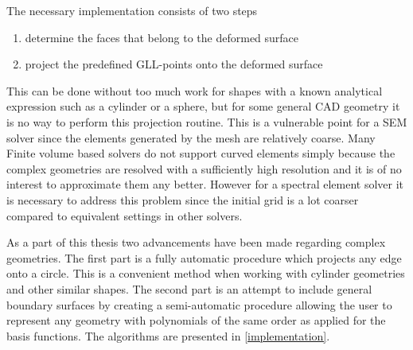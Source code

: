 The necessary implementation consists of two steps 
%
\begin{enumerate}
    \item determine the faces that belong to the deformed surface
    \item project the predefined GLL-points onto the deformed surface
\end{enumerate}
%
This can be done without too much work for shapes with a known analytical 
expression such as a cylinder or a sphere, but for some general CAD geometry 
it is no way to perform this projection routine. This is a vulnerable point 
for a SEM solver since the elements generated by the mesh are relatively coarse.
Many Finite volume based solvers do not support curved elements simply because the 
complex geometries are resolved with a sufficiently high resolution and it 
is of no interest to approximate them any better. However for a spectral element
solver it is necessary to address this problem since the initial grid is a lot coarser
compared to equivalent settings in other solvers.

As a part of this thesis two advancements have been made regarding complex geometries. 
The first part is a fully automatic procedure which projects any edge onto a circle. This is a
convenient method when working with cylinder geometries and other similar shapes. The second part
is an attempt to include general boundary surfaces by creating a semi-automatic procedure allowing 
the user to represent any geometry with polynomials of the same order as applied for the basis functions.
The algorithms are presented in \cref{implementation}. 
